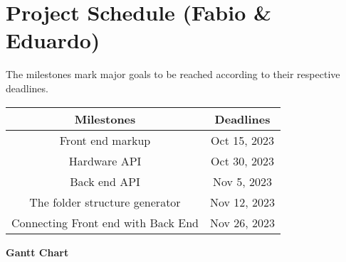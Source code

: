  \section{Project Schedule (Fabio \& Eduardo)}
 The milestones mark major goals to be reached according to their respective deadlines.
\begin{table}[H]
    \centering
    \begin{tabular}{||c | c||} 
        \hline
        \rowcolor{cyan}
        Milestones & Deadlines\\
        \hline
        Front end markup & Oct 15, 2023\\
        \hline
        Hardware API & Oct 30, 2023\\
        \hline
        Back end API & Nov 5, 2023\\
        \hline
        The folder structure generator & Nov 12, 2023\\
        \hline
        Connecting Front end with Back End & Nov 26, 2023\\
        \hline
    \end{tabular}
\end{table}
\textbf{Gantt Chart}\\


